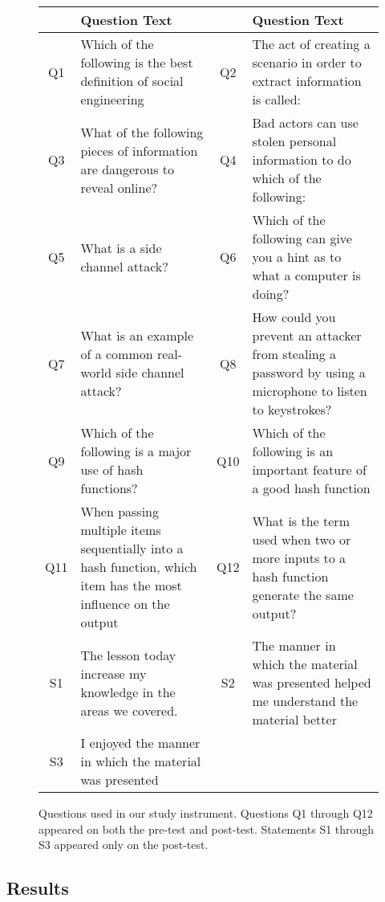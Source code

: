 \begin{figure*}[htb!]
  \scriptsize
  \begin{tabular}{c | p{8cm} | c | p{8cm}}
   & Question Text  &     & Question Text\\
\hline
Q1 & Which of the following is the best definition of social engineering  & Q2  & The act of creating a scenario in order to extract information is called:   \\
Q3 & What of the following pieces of information are dangerous to reveal online?  & Q4  & Bad actors can use stolen personal information to do which of the following: \\
Q5 & What is a side channel attack?  & Q6  & Which of the following can give you a hint as to what a computer is doing?   \\
Q7 & What is an example of a common real-world side channel attack?  & Q8  & How could you prevent an attacker from stealing a password by using a microphone to listen to keystrokes?\\
Q9 & Which of the following is a major use of hash functions? & Q10 & Which of the following is an important feature of a good hash function  \\
Q11 & When passing multiple items sequentially into a hash function, which item has the most influence on the output & Q12 & What is the term used when two or more inputs to a hash function generate the same output? \\
\hline
S1 & The lesson today increase my knowledge in the areas we covered. & S2  & The manner in which the material was presented helped me understand the material better\\
S3 & I enjoyed the manner in which the material was presented &     &              \\
\end{tabular}
\caption{Questions used in our study instrument.  Questions Q1 through Q12
    appeared on both the pre-test and post-test.  Statements S1 through S3
    appeared only on the post-test.}
\label{fig:assessment}
\end{figure*}


\subsection{Results}

